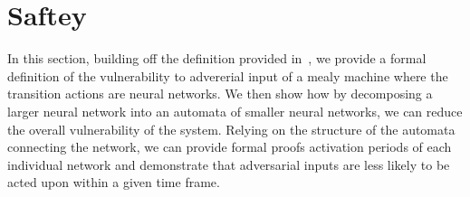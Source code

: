 \section{Saftey}

In this section, building off the definition provided in~\cite{DBLP:journals/corr/HuangKWW16}, we provide a formal definition of the vulnerability to advererial input of a mealy machine where the transition actions are neural networks.
We then show how by decomposing a larger neural network into an automata of smaller neural networks, we can reduce the overall vulnerability of the system.
Relying on the structure of the automata connecting the network, we can provide formal proofs activation periods of each individual network and demonstrate that adversarial inputs are less likely to be acted upon within a given time frame.
